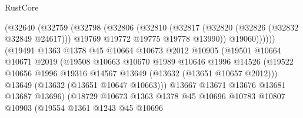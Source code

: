 \begin{lexlean}{RustCore}
\begin{coremodule}
                                (@32640
                                  (@32759
                                    (@32798
                                      (@32806
                                        (@32810
                                          (@32817
                                            (@32820 (@32826 (@32832 @32849 @24617)))
                                            @19769
                                            @19772
                                            @19775
                                            @19778
                                            @13990))
                                        @19060))))))
                            (@19491
                              @1363
                              @1378
                              @45
                              @10664
                              @10673
                              @2012
                              @10905
                              (@19501
                                @10664
                                @10671
                                @2019
                                (@19508
                                  @10663
                                  @10670
                                  @1989
                                  @10646
                                  @1996
                                  @14526
                                  (@19522
                                    @10656
                                    @1996
                                    @19316
                                    @14567
                                    @13649
                                    (@13632 (@13651 @10657 @2012)))
                                  @13649
                                  (@13632 (@13651 @10647 @10663)))
                                @13667
                                @13671
                                @13676
                                @13681
                                @13687
                                @13696)
                              (@18729
                                @10673
                                @1363
                                @1378
                                @45
                                @10696
                                @10783
                                @10807
                                @10903
                                (@19554
                                  @1361
                                  @1243
                                  @45
                                  @10696

\end{coremodule}
\end{lexlean}
